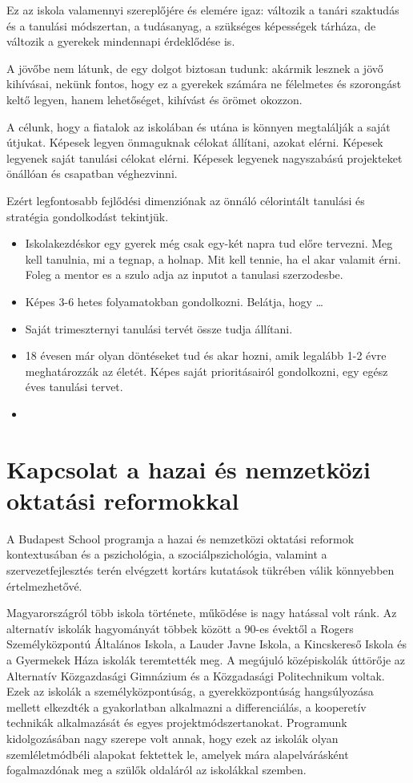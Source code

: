 Ez az iskola valamennyi szereplőjére és elemére igaz: változik a tanári
szaktudás és a tanulási módszertan, a tudásanyag, a szükséges képességek
tárháza, de változik a gyerekek mindennapi érdeklődése is.

A jövőbe nem látunk, de egy dolgot biztosan tudunk: akármik lesznek a jövő
kihívásai, nekünk fontos, hogy ez a gyerekek számára ne félelmetes és
szorongást keltő legyen, hanem lehetőséget, kihívást és örömet okozzon.

A célunk, hogy a fiatalok az iskolában és utána is könnyen megtalálják a saját
útjukat. Képesek legyen önmaguknak célokat állítani, azokat elérni. Képesek
legyenek saját tanulási célokat elérni. Képesek legyenek nagyszabású
projekteket önállóan és csapatban véghezvinni.

Ezért legfontosabb fejlődési dimenziónak az önnáló célorintált tanulási és
stratégia gondolkodást tekintjük.
\begin{itemize}
      \item Iskolakezdéskor egy gyerek még csak egy-két napra tud előre
            tervezni. Meg kell tanulnia, mi a tegnap, a holnap. Mit kell tennie, ha el akar
            valamit érni. Foleg a mentor es a szulo adja az inputot a tanulasi szerzodesbe.
      \item Képes 3-6 hetes folyamatokban gondolkozni. Belátja, hogy \dots
      \item Saját trimeszternyi tanulási tervét össze tudja állítani.
      \item 18 évesen már olyan döntéseket tud és akar hozni, amik legalább 1-2
            évre meghatározzák az életét. Képes saját prioritásairól gondolkozni, egy egész
            éves tanulási tervet.
      \item
\end{itemize}

\section{Kapcsolat a hazai és nemzetközi oktatási
  reformokkal}\label{sec:kapcsolat_reformokkal}

A Budapest School programja a hazai és nemzetközi oktatási reformok
kontextusában és a pszichológia, a szociálpszichológia, valamint a
szervezetfejlesztés terén elvégzett kortárs kutatások tükrében válik
könnyebben értelmezhetővé.

Magyarországról több iskola története, működése is nagy hatással volt ránk. Az
alternatív iskolák hagyományát többek között a 90-es évektől a Rogers
Személyközpontú Általános Iskola, a Lauder Javne Iskola, a Kincskereső
Iskola és a Gyermekek Háza iskolák teremtették meg. A megújuló
középiskolák úttörője az Alternatív Közgazdasági Gimnázium és a
Közgadasági Politechnikum voltak. Ezek az iskolák a személyközpontúság,
a gyerekközpontúság hangsúlyozása mellett elkezdték a gyakorlatban
alkalmazni a differenciálás, a kooperetív technikák alkalmazását és
egyes projektmódszertanokat. Programunk kidolgozásában nagy szerepe volt
annak, hogy ezek az iskolák olyan szemléletmódbéli alapokat fektettek
le, amelyek mára alapelvárásként fogalmazdónak meg a szülők oldaláról az
iskolákkal szemben.

